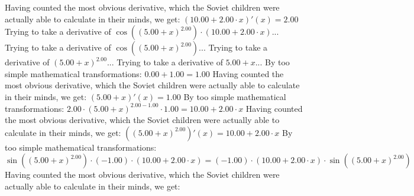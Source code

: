 \documentclass{article}
\begin{document}
 \newline
 \newline 
Having counted the most obvious derivative, which the Soviet children were actually able to calculate in their minds, we get:
$({{10.00} + {{2.00} \cdot {x}}})'(x) = {2.00}$\newline
\newline
Trying to take a derivative of ${ \cos {\left({\left({{5.00} + {x}}\right) ^ {2.00}}\right)}  \cdot \left({{10.00} + {{2.00} \cdot {x}}}\right)}$...\newline
\newline
Trying to take a derivative of $ \cos {\left({\left({{5.00} + {x}}\right) ^ {2.00}}\right)} $...\newline
\newline
Trying to take a derivative of ${\left({{5.00} + {x}}\right) ^ {2.00}}$...\newline
\newline
Trying to take a derivative of ${{5.00} + {x}}$...\newline
\newline
By too simple mathematical transformations:
 ${{0.00} + {1.00}} = {1.00}$ 
 \newline
 \newline 
Having counted the most obvious derivative, which the Soviet children were actually able to calculate in their minds, we get:
$({{5.00} + {x}})'(x) = {1.00}$\newline
\newline
By too simple mathematical transformations:
 ${{{2.00} \cdot {\left({{5.00} + {x}}\right) ^ {{2.00} - {1.00}}}} \cdot {1.00}} = {{10.00} + {{2.00} \cdot {x}}}$ 
 \newline
 \newline 
Having counted the most obvious derivative, which the Soviet children were actually able to calculate in their minds, we get:
$({\left({{5.00} + {x}}\right) ^ {2.00}})'(x) = {{10.00} + {{2.00} \cdot {x}}}$\newline
\newline
By too simple mathematical transformations:
 ${{ \sin {\left({\left({{5.00} + {x}}\right) ^ {2.00}}\right)}  \cdot \left({-1.00}\right)} \cdot \left({{10.00} + {{2.00} \cdot {x}}}\right)} = {\left({-1.00}\right) \cdot {\left({{10.00} + {{2.00} \cdot {x}}}\right) \cdot  \sin {\left({\left({{5.00} + {x}}\right) ^ {2.00}}\right)} }}$ 
 \newline
 \newline 
Having counted the most obvious derivative, which the Soviet children were actually able to calculate in their minds, we get:
\end{document}
